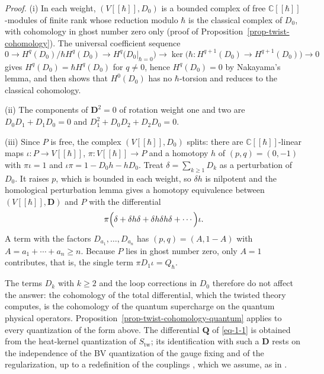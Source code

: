 \documentclass[11pt]{article}
\numberwithin{equation}{section}
\numberwithin{figure}{section}
\numberwithin{table}{section}
\begin{document}
\emph{Proof.} (i) In each weight, $(V[[\hbar]],D_0)$ is a bounded complex of free $\mathbb C[[\hbar]]$-modules of finite rank whose reduction modulo $\hbar$ is the classical complex of $D_0$, with cohomology in ghost number zero only (proof of Proposition~\ref{prop-twist-cohomology}). The universal coefficient sequence
\begin{equation*}
0\to H^q(D_0)/\hbar H^q(D_0)\to H^q\bigl(D_0|_{\hbar=0}\bigr)\to\ker\bigl(\hbar:H^{q+1}(D_0)\to H^{q+1}(D_0)\bigr)\to0
\end{equation*}
gives $H^q(D_0)=\hbar H^q(D_0)$ for $q\ne0$, hence $H^q(D_0)=0$ by Nakayama's lemma, and then shows that $H^0(D_0)$ has no $\hbar$-torsion and reduces to the classical cohomology.

(ii) The components of $\mathbf D^2=0$ of rotation weight one and two are $D_0D_1+D_1D_0=0$ and $D_1^2+D_0D_2+D_2D_0=0$.

(iii) Since $P$ is free, the complex $(V[[\hbar]],D_0)$ splits: there are $\mathbb C[[\hbar]]$-linear maps $\iota:P\to V[[\hbar]]$, $\pi:V[[\hbar]]\to P$ and a homotopy $h$ of $(p,q)=(0,-1)$ with $\pi\iota=1$ and $\iota\pi=1-D_0h-hD_0$. Treat $\delta=\sum_{k\ge1}D_k$ as a perturbation of $D_0$. It raises $p$, which is bounded in each weight, so $\delta h$ is nilpotent and the homological perturbation lemma gives a homotopy equivalence between $(V[[\hbar]],\mathbf D)$ and $P$ with the differential
\begin{equation*}
\pi\Bigl(\delta+\delta h\delta+\delta h\delta h\delta+\cdots\Bigr)\iota .
\end{equation*}
A term with the factors $D_{a_1},\ldots,D_{a_n}$ has $(p,q)=(A,1-A)$ with $A=a_1+\cdots+a_n\ge n$. Because $P$ lies in ghost number zero, only $A=1$ contributes, that is, the single term $\pi D_1\iota=Q_\hbar$.~\hfill\qedsymbol

The terms $D_k$ with $k\ge2$ and the loop corrections in $D_0$ therefore do not affect the answer: the cohomology of the total differential, which the twisted theory computes, is the cohomology of the quantum supercharge on the quantum physical operators. Proposition~\ref{prop-twist-cohomology-quantum} applies to every quantization of the form above. The differential $\mathbf Q$ of \eqref{eq-1-1} is obtained from the heat-kernel quantization of $S_{\mathrm{tw}}$; its identification with such a $\mathbf D$ rests on the independence of the BV quantization of the gauge fixing and of the regularization, up to a redefinition of the couplings \cite{Costello}, which we assume, as in \cite{semichiral,BK}.
\end{document}
